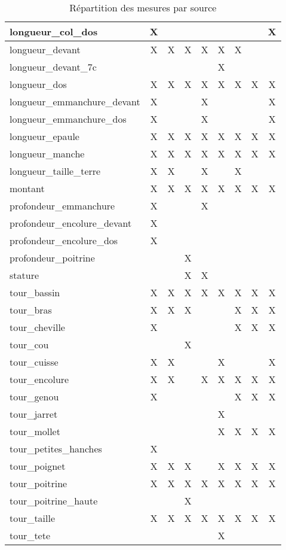 \documentclass[10pt,a4paper,twoside]{report}
\begin{document}
\begin{table}
\begin{center}
\begin{tabular}{lcccccccc}
longueur\_col\_dos&X&&&&&&&X\\ \hline
longueur\_devant&X&X&X&X&X&X&&\\ \hline
longueur\_devant\_7c&&&&&X&&&\\ \hline
longueur\_dos&X&X&X&X&X&X&X&X\\ \hline
longueur\_emmanchure\_devant&X&&&X&&&&X\\ \hline
longueur\_emmanchure\_dos&X&&&X&&&&X\\ \hline
longueur\_epaule&X&X&X&X&X&X&X&X\\ \hline
longueur\_manche&X&X&X&X&X&X&X&X\\ \hline
longueur\_taille\_terre&X&X&&X&&X&&\\ \hline
montant&X&X&X&X&X&X&X&X\\ \hline
profondeur\_emmanchure&X&&&X&&&&\\ \hline
profondeur\_encolure\_devant&X&&&&&&&\\ \hline
profondeur\_encolure\_dos&X&&&&&&&\\ \hline
profondeur\_poitrine&&&X&&&&&\\ \hline
stature&&&X&X&&&&\\ \hline
tour\_bassin&X&X&X&X&X&X&X&X\\ \hline
tour\_bras&X&X&X&&&X&X&X\\ \hline
tour\_cheville&X&&&&&X&X&X\\ \hline
tour\_cou&&&X&&&&&\\ \hline
tour\_cuisse&X&X&&&X&&&X\\ \hline
tour\_encolure&X&X&&X&X&X&X&X\\ \hline
tour\_genou&X&&&&&X&X&X\\ \hline
tour\_jarret&&&&&X&&&\\ \hline
tour\_mollet&&&&&X&X&X&X\\ \hline
tour\_petites\_hanches&X&&&&&&&\\ \hline
tour\_poignet&X&X&X&&X&X&X&X\\ \hline
tour\_poitrine&X&X&X&X&X&X&X&X\\ \hline
tour\_poitrine\_haute&&&X&&&&&\\ \hline
tour\_taille&X&X&X&X&X&X&X&X\\ \hline
tour\_tete&&&&&X&&&\\ \hline
\end{tabular}
\end{center}
\label{tab:meas_det}
\caption{Répartition des mesures par source}
\end{table}
\end{document}
